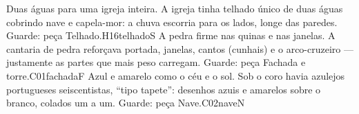 \linhacartas
{
{Duas águas para uma igreja inteira.}
{A igreja tinha telhado único de duas águas cobrindo nave e capela-mor: a chuva escorria para os lados, longe das paredes.}
{Guarde: peça Telhado.}{H16}{telhado}{S}}
{
{A pedra firme nas quinas e nas janelas.}
{A cantaria de pedra reforçava portada, janelas, cantos (cunhais) e o arco-cruzeiro --- justamente as partes que mais peso carregam.}
{Guarde: peça Fachada e torre.}{C01}{fachada}{F}}
{
{Azul e amarelo como o céu e o sol.}
{Sob o coro havia azulejos portugueses seiscentistas, ``tipo tapete'': desenhos azuis e amarelos sobre o branco, colados um a um.}
{Guarde: peça Nave.}{C02}{nave}{N}}
\newpage


